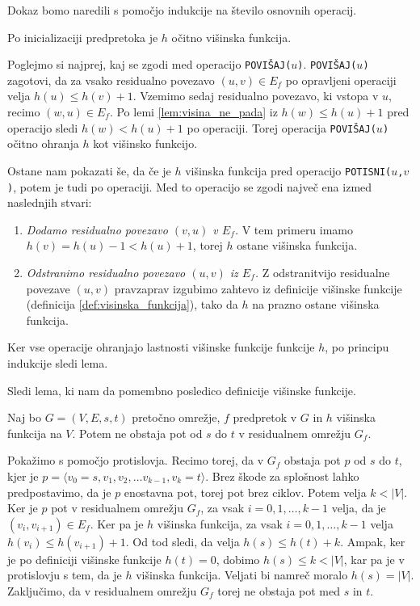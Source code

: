 \documentclass[mat1]{fmfdelo}
\begin{document}
\begin{dokaz}
Dokaz bomo naredili s pomočjo indukcije na število osnovnih operacij.

Po inicializaciji predpretoka je $h$ očitno višinska funkcija.

Poglejmo si najprej, kaj se zgodi med operacijo \texttt{POVIŠAJ($u$)}. \texttt{POVIŠAJ($u$)} za\-gotovi, da za vsako residualno povezavo $(u,v) \in E_f$ po opravljeni operaciji velja $h(u) \leq h(v) +1$. Vzemimo sedaj residualno povezavo, ki vstopa v $u$, recimo $(w,u) \in E_f$. Po lemi \ref{lem:visina_ne_pada} iz $h(w) \leq h(u) + 1$ pred operacijo sledi $h(w) < h(u) + 1$ po operaciji. Torej operacija \texttt{POVIŠAJ($u$)} očitno ohranja $h$ kot višinsko funkcijo.

Ostane nam pokazati še, da če je $h$ višinska funkcija pred operacijo \texttt{POTISNI($u$,$v$)}, potem je tudi po operaciji. Med to operacijo se zgodi največ ena izmed naslednjih stvari:

\begin{enumerate}
\item \textit{Dodamo residualno povezavo $(v,u)$ v $E_f$.} V tem primeru imamo $h(v) = h(u) - 1 < h(u) + 1$, torej $h$ ostane višinska funkcija.
\item \textit{Odstranimo residualno povezavo $(u,v)$ iz $E_f$.} Z odstranitvijo residualne povezave $(u,v)$ pravzaprav izgubimo zahtevo iz definicije višinske funkcije (definicija \ref{def:visinska_funkcija}), tako da $h$ na prazno ostane višinska funkcija.
\end{enumerate}

Ker vse operacije ohranjajo lastnosti višinske funkcije funkcije $h$, po principu indukcije sledi lema.
\end{dokaz}

Sledi lema, ki nam da pomembno posledico definicije višinske funkcije.

\begin{lema}\label{lem:ni_poti}
Naj bo $G=(V,E,s,t)$ pretočno omrežje, $f$ predpretok v $G$ in $h$ višinska funkcija na $V$. Potem ne obstaja pot od $s$ do $t$ v residualnem omrežju $G_f$.
\end{lema}

\begin{dokaz}
Pokažimo s pomočjo protislovja. Recimo torej, da v $G_f$ obstaja pot $p$ od $s$ do $t$, kjer je $p = \langle v_0 = s, v_1, v_2, \dotsc v_{k-1}, v_k = t\rangle$. Brez škode za splošnost lahko predpostavimo, da je $p$ enostavna pot, torej pot brez ciklov. Potem velja $k < |V|$. Ker je $p$ pot v residualnem omrežju $G_f$, za vsak $i = 0, 1, \dotsc, k-1$ velja, da je $(v_i, v_{i+1}) \in E_f$. Ker pa je $h$ višinska funkcija, za vsak $i = 0, 1, \dotsc, k-1$ velja $h(v_i) \leq h(v_{i+1}) + 1$. Od tod sledi, da velja $h(s) \leq h(t) + k$. Ampak, ker je po definiciji višinske funkcije $h(t) = 0$, dobimo $h(s) \leq k < |V|$, kar pa je v protislovju s tem, da je $h$ višinska funkcija. Veljati bi namreč moralo $h(s) = |V|$. Zaključimo, da v residualnem omrežju $G_f$ torej ne obstaja pot med $s$ in $t$.
\end{dokaz}
\end{document}
